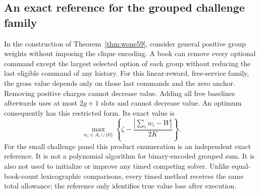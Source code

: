 \subsection{An exact reference for the grouped challenge family}
In the construction of Theorem~\ref{thm:wone59}, consider general positive group weights without imposing the clique encoding. A book can remove every optional command except the largest selected option of each group without reducing the last eligible command of any history. For this linear-reward, free-service family, the gross value depends only on those last commands and the zero anchor. Removing positive charges cannot decrease value. Adding all free baselines afterwards uses at most $2g+1$ slots and cannot decrease value. An optimum consequently has this restricted form. Its exact value is
\[
 \max_{w_i\in A_i\cup\{0\}}\left\{\zeta-\frac{|\sum_iw_i-W|}{2K}\right\}.
\]
For the small challenge panel this product enumeration is an independent exact reference. It is not a polynomial algorithm for binary-encoded grouped sum. It is also not used to initialize or improve any timed competing solver. Unlike equal-book-count lexicographic comparisons, every timed method receives the same total allowance; the reference only identifies true value loss after execution.
